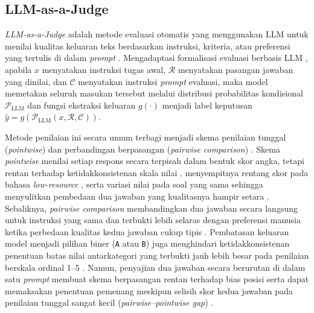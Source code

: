 \subsection{LLM-as-a-Judge}

\textit{LLM-as-a-Judge} adalah metode evaluasi otomatis yang menggunakan LLM untuk menilai kualitas keluaran teks berdasarkan instruksi, kriteria, atau preferensi yang tertulis di dalam \textit{prompt} \cite{zhengJudgingLLMasaJudgeMTBench2023}\cite{guSurveyLLMasaJudge2025}. Mengadaptasi formalisasi evaluasi berbasis LLM \cite{guSurveyLLMasaJudge2025}\cite{liLLMsasJudgesComprehensiveSurvey2024}, apabila $x$ menyatakan instruksi tugas awal, $\mathcal{R}$ menyatakan pasangan jawaban yang dinilai, dan $\mathcal{C}$ menyatakan instruksi \textit{prompt} evaluasi, maka model memetakan seluruh masukan tersebut melalui distribusi probabilitas kondisional $\mathcal{P}_{\text{LLM}}$ dan fungsi ekstraksi keluaran $g(\cdot)$ menjadi label keputusan $\hat{y} = g(\mathcal{P}_{\text{LLM}}(x, \mathcal{R}, \mathcal{C}))$.

Metode penilaian ini secara umum terbagi menjadi skema penilaian tunggal (\textit{pointwise}) dan perbandingan berpasangan (\textit{pairwise comparison}) \cite{zhengJudgingLLMasaJudgeMTBench2023}\cite{liLLMsasJudgesComprehensiveSurvey2024}. Skema \textit{pointwise} menilai setiap respons secara terpisah dalam bentuk skor angka, tetapi rentan terhadap ketidakkonsistenan skala nilai \cite{liSplitMergeAligning2024}, menyempitnya rentang skor pada bahasa \textit{low-resource} \cite{sonMMEvalMultilingualMetaEvaluation2025}, serta variasi nilai pada soal yang sama sehingga menyulitkan pembedaan dua jawaban yang kualitasnya hampir setara \cite{zhengJudgingLLMasaJudgeMTBench2023}\cite{liLLMsasJudgesComprehensiveSurvey2024}\cite{yagubyanCoinFlipJudge2026}. Sebaliknya, \textit{pairwise comparison} membandingkan dua jawaban secara langsung untuk instruksi yang sama dan terbukti lebih selaras dengan preferensi manusia ketika perbedaan kualitas kedua jawaban cukup tipis \cite{zhengJudgingLLMasaJudgeMTBench2023}\cite{liLLMsasJudgesComprehensiveSurvey2024}. Pembatasan keluaran model menjadi pilihan biner (\texttt{A} atau \texttt{B}) juga menghindari ketidakkonsistenan penentuan batas nilai antarkategori yang terbukti jauh lebih besar pada penilaian berskala ordinal 1--5 \cite{bellibatluJudgeSenseBenchmarkPrompt2026}\cite{fuHowReliableMultilingual2025}. Namun, penyajian dua jawaban secara berurutan di dalam satu \textit{prompt} membuat skema berpasangan rentan terhadap bias posisi \cite{guSurveyLLMasaJudge2025} serta dapat memaksakan penentuan pemenang meskipun selisih skor kedua jawaban pada penilaian tunggal sangat kecil (\textit{pairwise--pointwise gap}) \cite{yagubyanCoinFlipJudge2026}.

